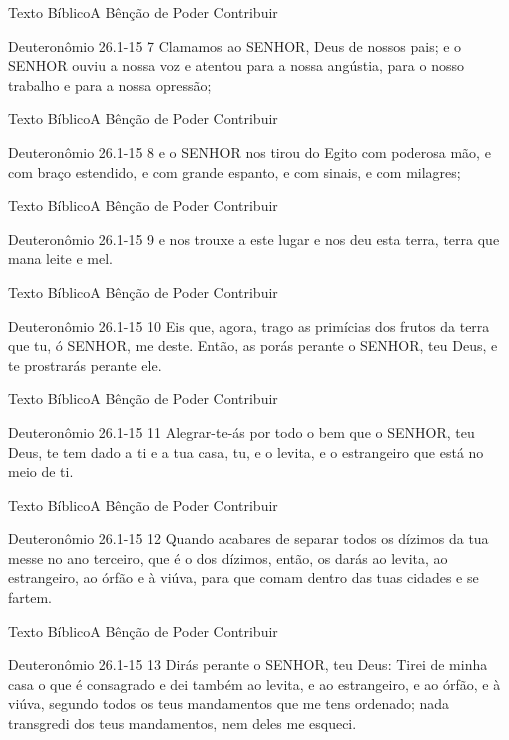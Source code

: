 \documentclass[14pt,aspectratio=169]{beamer}
\newcommand{\TT}{A Bênção de Poder Contribuir}
\newcommand{\TB}{Texto Bíblico}
\newcommand{\DT}{Deuteronômio 26.1-15}
\begin{document}
\begin{frame}{\TB}{\TT}
 \begin{block}{\DT}
7 Clamamos ao SENHOR, Deus de nossos pais; e o SENHOR ouviu a nossa voz e atentou para a nossa angústia, para o nosso trabalho e para a nossa opressão;
 \end{block}
\end{frame}

\begin{frame}{\TB}{\TT}
 \begin{block}{\DT}
8 e o SENHOR nos tirou do Egito com poderosa mão, e com braço estendido, e com grande espanto, e com sinais, e com milagres;
 \end{block}
\end{frame}

\begin{frame}{\TB}{\TT}
 \begin{block}{\DT}
9 e nos trouxe a este lugar e nos deu esta terra, terra que mana leite e mel.
 \end{block}
\end{frame}

\begin{frame}{\TB}{\TT}
 \begin{block}{\DT}
10 Eis que, agora, trago as primícias dos frutos da terra que tu, ó SENHOR, me deste. Então, as porás perante o SENHOR, teu Deus, e te prostrarás perante ele.
 \end{block}
\end{frame}

\begin{frame}{\TB}{\TT}
 \begin{block}{\DT}
11 Alegrar-te-ás por todo o bem que o SENHOR, teu Deus, te tem dado a ti e a tua casa, tu, e o levita, e o estrangeiro que está no meio de ti.
 \end{block}
\end{frame}

\begin{frame}{\TB}{\TT}
 \begin{block}{\DT}
 \Large
12 Quando acabares de separar todos os dízimos da tua messe no ano terceiro, que é o dos dízimos, então, os darás ao levita, ao estrangeiro, ao órfão e à viúva, para que comam dentro das tuas cidades e se fartem.
 \end{block}
\end{frame}

\begin{frame}{\TB}{\TT}
 \begin{block}{\DT}
 \Large
13 Dirás perante o SENHOR, teu Deus: Tirei de minha casa o que é consagrado e dei também ao levita, e ao estrangeiro, e ao órfão, e à viúva, segundo todos os teus mandamentos que me tens ordenado; nada transgredi dos teus mandamentos, nem deles me esqueci.
 \end{block}
\end{frame}
\end{document}
